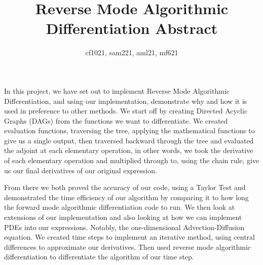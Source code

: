 \documentclass{article}
\title{Reverse Mode Algorithmic Differentiation Abstract}
\author{cf1021, sam221, aml21, mf621}
\date{}
\begin{document}
\maketitle

In this project, we have set out to implement Reverse Mode Algorithmic Differentiation, and using our implementation, demonstrate why and how it is used in preference to other methods. We start off by creating Directed Acyclic Graphs (DAGs) from the functions we want to differentiate. We created evaluation functions, traversing the tree, applying the mathematical functions to give us a single output, then traversed backward through the tree and evaluated the adjoint at each elementary operation, in other words, we took the derivative of each elementary operation and multiplied through to, using the chain rule, give us our final derivatives of our original expression.

From there we both proved the accuracy of our code, using a Taylor Test and demonstrated the time efficiency of our algorithm by comparing it to how long the forward mode algorithmic differentiation code to run. We then look at extensions of our implementation and also looking at how we can implement PDEs into our expressions. Notably, the one-dimensional Advection-Diffusion equation. We created time steps to implement an iterative method, using central differences to approximate our derivatives. Then used reverse mode algorithmic differentiation to differentiate the algorithm of our time step.
\end{document}
